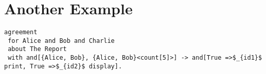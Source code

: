\section {Another Example}
\lstset{language=Pucella2006}
\begin{minipage}[c]{0.95\textwidth}
\begin{lstlisting}[frame=single, caption={Agreement of Example 2.4},label={lst:pucellatwofourexampleAST}, mathescape]
agreement
 for Alice and Bob and Charlie
 about The Report 
 with and[{Alice, Bob}, {Alice, Bob}<count[5]>] -> and[True =>$_{id1}$ print, True =>$_{id2}$ display].
\end{lstlisting}
\end{minipage} 
%
%
%
